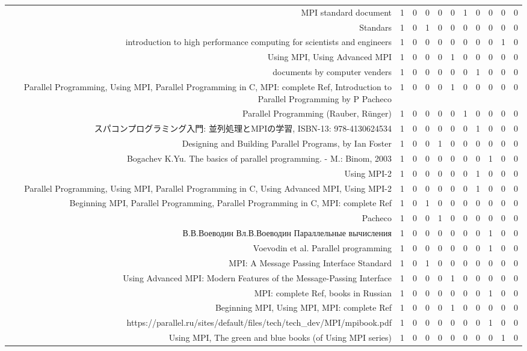 {\begin{landscape}
\begin{longtable}[htb]{r|c|c|c|c|c|c|c|c|c|c}
{MPI standard document} & 1 & 0 & 0 & 0 & 0 & 1 & 0 & 0 & 0 & 0 \\%
{Standars} & 1 & 0 & 1 & 0 & 0 & 0 & 0 & 0 & 0 & 0 \\%
{introduction to high performance computing for scientists and engineers} & 1 & 0 & 0 & 0 & 0 & 0 & 0 & 0 & 1 & 0 \\%
{Using MPI, Using Advanced MPI} & 1 & 0 & 0 & 0 & 1 & 0 & 0 & 0 & 0 & 0 \\%
{documents by computer venders} & 1 & 0 & 0 & 0 & 0 & 0 & 1 & 0 & 0 & 0 \\%
{Parallel Programming, Using MPI, Parallel Programming in C, MPI: complete Ref, Introduction to Parallel Programming by P Pacheco} & 1 & 0 & 0 & 0 & 1 & 0 & 0 & 0 & 0 & 0 \\%
{Parallel Programming (Rauber, Rünger)} & 1 & 0 & 0 & 0 & 0 & 1 & 0 & 0 & 0 & 0 \\%
{スパコンプログラミング入門: 並列処理とMPIの学習, ISBN-13: 978-4130624534} & 1 & 0 & 0 & 0 & 0 & 0 & 1 & 0 & 0 & 0 \\%
{Designing and Building Parallel Programs, by Ian Foster} & 1 & 0 & 0 & 1 & 0 & 0 & 0 & 0 & 0 & 0 \\%
{Bogachev K.Yu. The basics of parallel programming. - M.: Binom, 2003} & 1 & 0 & 0 & 0 & 0 & 0 & 0 & 1 & 0 & 0 \\%
{Using MPI-2} & 1 & 0 & 0 & 0 & 0 & 0 & 1 & 0 & 0 & 0 \\%
{Parallel Programming, Using MPI, Parallel Programming in C, Using Advanced MPI, Using MPI-2} & 1 & 0 & 0 & 0 & 0 & 0 & 1 & 0 & 0 & 0 \\%
{Beginning MPI, Parallel Programming, Parallel Programming in C, MPI: complete Ref} & 1 & 0 & 1 & 0 & 0 & 0 & 0 & 0 & 0 & 0 \\%
{Pacheco} & 1 & 0 & 0 & 1 & 0 & 0 & 0 & 0 & 0 & 0 \\%
{В.В.Воеводин Вл.В.Воеводин Параллельные вычисления} & 1 & 0 & 0 & 0 & 0 & 0 & 0 & 1 & 0 & 0 \\%
{Voevodin et al. Parallel programming} & 1 & 0 & 0 & 0 & 0 & 0 & 0 & 1 & 0 & 0 \\%
{MPI: A Message Passing Interface Standard} & 1 & 0 & 1 & 0 & 0 & 0 & 0 & 0 & 0 & 0 \\%
{Using Advanced MPI: Modern Features of the Message-Passing Interface} & 1 & 0 & 0 & 0 & 1 & 0 & 0 & 0 & 0 & 0 \\%
{MPI: complete Ref, books in Russian} & 1 & 0 & 0 & 0 & 0 & 0 & 0 & 1 & 0 & 0 \\%
{Beginning MPI, Using MPI, MPI: complete Ref} & 1 & 0 & 0 & 0 & 1 & 0 & 0 & 0 & 0 & 0 \\%
{https://parallel.ru/sites/default/files/tech/tech\_dev/MPI/mpibook.pdf} & 1 & 0 & 0 & 0 & 0 & 0 & 0 & 1 & 0 & 0 \\%
{Using MPI, The green and blue books (of Using MPI series)} & 1 & 0 & 0 & 0 & 0 & 0 & 0 & 0 & 1 & 0 \\%
\hline%
\end{longtable}%
\end{landscape}}%
\clearpage%
